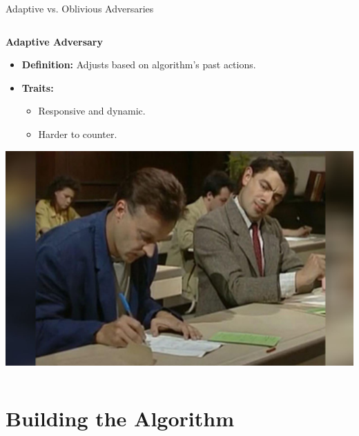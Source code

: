 \documentclass{beamer}
\begin{document}
\begin{frame}{Adaptive vs. Oblivious Adversaries}
\begin{columns}[T]
        \begin{column}{0.45\textwidth}
            \textbf{Adaptive Adversary}
            \begin{itemize}
                \item \textbf{Definition:} Adjusts based on algorithm's past actions.
                \item \textbf{Traits:}
                \begin{itemize}
                    \item Responsive and dynamic.
                    \item Harder to counter.
                \end{itemize}
            \end{itemize}
            \vspace{0.2cm}
            \includegraphics[width=\linewidth]{images/adaptive.jpg}
        \end{column}
    \end{columns}

\end{frame}
\section{Building the Algorithm}
\end{document}
